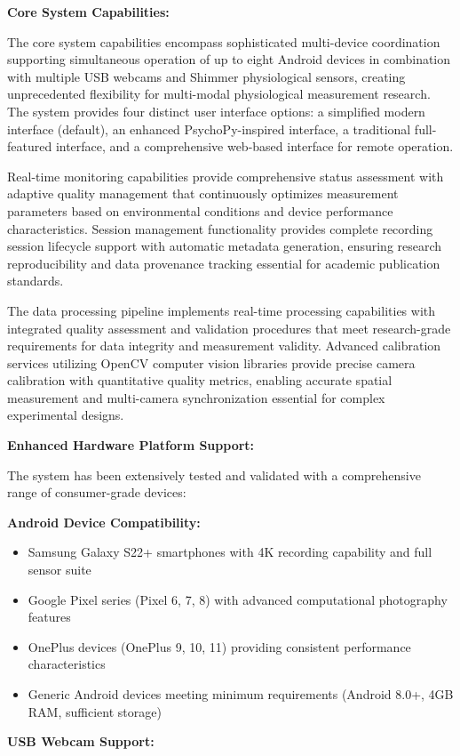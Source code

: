 \documentclass[11pt,a4paper]{article}
\begin{document}
\textbf{Core System Capabilities:}

The core system capabilities encompass sophisticated multi-device coordination supporting simultaneous operation of up
to eight Android devices in combination with multiple USB webcams and Shimmer physiological sensors, creating
unprecedented flexibility for multi-modal physiological measurement research. The system provides four distinct user
interface options: a simplified modern interface (default), an enhanced PsychoPy-inspired interface, a traditional
full-featured interface, and a comprehensive web-based interface for remote operation.

Real-time monitoring capabilities provide comprehensive status assessment with adaptive quality management that
continuously optimizes measurement parameters based on environmental conditions and device performance characteristics.
Session management functionality provides complete recording session lifecycle support with automatic metadata
generation, ensuring research reproducibility and data provenance tracking essential for academic publication standards.

The data processing pipeline implements real-time processing capabilities with integrated quality assessment and
validation procedures that meet research-grade requirements for data integrity and measurement validity. Advanced
calibration services utilizing OpenCV computer vision libraries provide precise camera calibration with quantitative
quality metrics, enabling accurate spatial measurement and multi-camera synchronization essential for complex
experimental designs.

\textbf{Enhanced Hardware Platform Support:}

The system has been extensively tested and validated with a comprehensive range of consumer-grade devices:

\textbf{Android Device Compatibility:}

\begin{itemize}
\item Samsung Galaxy S22+ smartphones with 4K recording capability and full sensor suite
\item Google Pixel series (Pixel 6, 7, 8) with advanced computational photography features
\item OnePlus devices (OnePlus 9, 10, 11) providing consistent performance characteristics
\item Generic Android devices meeting minimum requirements (Android 8.0+, 4GB RAM, sufficient storage)

\end{itemize}
\textbf{USB Webcam Support:}
\end{document}
